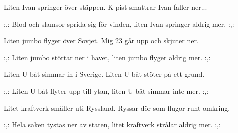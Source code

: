 


	
\beginverse*		%
Liten Ivan springer över stäppen.
K-pist smattrar Ivan faller ner...
\endverse			%

\beginchorus
:,: Blod och slamsor sprida sig för vinden,
liten Ivan springer aldrig mer. :,:
\endchorus

\beginverse*		%
Liten jumbo flyger över Sovjet.
Mig 23 går upp och skjuter ner.
\endverse			%

\beginchorus
:,: Liten jumbo störtar ner i havet,
liten jumbo flyger aldrig mer. :,:
\endchorus

\beginverse*		%
Liten U-båt simmar in i Sverige.
Liten U-båt stöter på ett grund.
\endverse			%

\beginchorus
:,: Liten U-båt flyter upp till ytan,
liten U-båt simmar inte mer. :,:
\endchorus

\beginverse*		%
Litet kraftverk smäller uti Ryssland.
Ryssar dör som flugor runt omkring.
\endverse			%

\beginchorus
:,: Hela saken tystas ner av staten,
litet kraftverk strålar aldrig mer. :,:
\endchorus
\endsong			%

